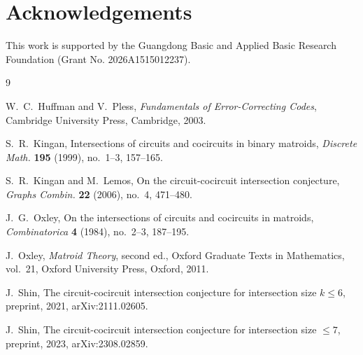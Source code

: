 \documentclass[11pt]{article}
\numberwithin{equation}{section}
\begin{document}
\section*{Acknowledgements}
This work is supported by the Guangdong Basic and Applied Basic Research Foundation (Grant No. 2026A1515012237).

\begin{thebibliography}{9}

W.~C.~Huffman and V.~Pless,
\emph{Fundamentals of Error-Correcting Codes},
Cambridge University Press, Cambridge, 2003.

S.~R.~Kingan,
Intersections of circuits and cocircuits in binary matroids,
\emph{Discrete Math.} \textbf{195} (1999), no.~1--3, 157--165.

S.~R.~Kingan and M.~Lemos,
On the circuit-cocircuit intersection conjecture,
\emph{Graphs Combin.} \textbf{22} (2006), no.~4, 471--480.

J.~G.~Oxley,
On the intersections of circuits and cocircuits in matroids,
\emph{Combinatorica} \textbf{4} (1984), no.~2--3, 187--195.

J.~Oxley,
\emph{Matroid Theory}, second ed.,
Oxford Graduate Texts in Mathematics, vol.~21,
Oxford University Press, Oxford, 2011.

J.~Shin,
The circuit-cocircuit intersection conjecture for intersection size $k\leq6$,
preprint, 2021, arXiv:2111.02605.

J.~Shin,
The circuit-cocircuit intersection conjecture for intersection size $\leq7$,
preprint, 2023, arXiv:2308.02859.
\end{thebibliography}
\end{document}
